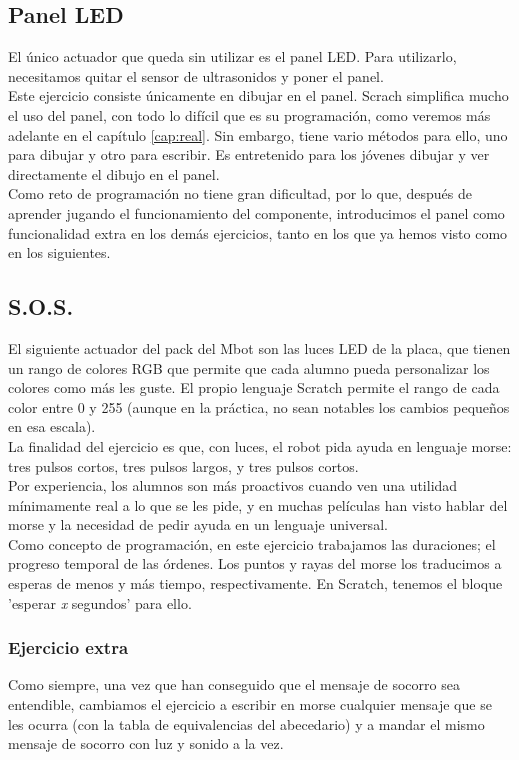 \subsection{Panel LED}
El único actuador que queda sin utilizar es el panel LED. Para utilizarlo, necesitamos quitar el sensor de ultrasonidos y poner el panel.\\
Este ejercicio consiste únicamente en dibujar en el panel. Scrach simplifica mucho el uso del panel, con todo lo difícil que es su programación, como veremos más adelante en el capítulo \ref{cap:real}. Sin embargo, tiene vario métodos para ello, uno para dibujar y otro para escribir. Es entretenido para los jóvenes dibujar y ver directamente el dibujo en el panel. \\
Como reto de programación no tiene gran dificultad, por lo que, después de aprender jugando el funcionamiento del componente, introducimos el panel como funcionalidad extra en los demás ejercicios, tanto en los que ya hemos visto como en los siguientes. 
\subsection{S.O.S.}
El siguiente actuador del pack del Mbot son las luces LED de la placa, que tienen un rango de colores RGB que permite que cada alumno pueda personalizar los colores como más les guste. El propio lenguaje Scratch permite el rango de cada color entre 0 y 255 (aunque en la práctica, no sean notables los cambios pequeños en esa escala).\\
La finalidad del ejercicio es que, con luces, el robot pida ayuda en lenguaje morse: tres pulsos cortos, tres pulsos largos, y tres pulsos cortos. \\
Por experiencia, los alumnos son más proactivos cuando ven una utilidad mínimamente real a lo que se les pide, y en muchas películas han visto hablar del morse y la necesidad de pedir ayuda en un lenguaje universal. \\
Como concepto de programación, en este ejercicio trabajamos las duraciones; el progreso temporal de las órdenes. Los puntos y rayas del morse los traducimos a esperas de menos y más tiempo, respectivamente. En Scratch, tenemos el bloque 'esperar \textit{x} segundos' para ello.
\subsubsection{Ejercicio extra}
Como siempre, una vez que han conseguido que el mensaje de socorro sea entendible, cambiamos el ejercicio a escribir en morse cualquier mensaje que se les ocurra (con la tabla de equivalencias del abecedario) y a mandar el mismo mensaje de socorro con luz y sonido a la vez.

